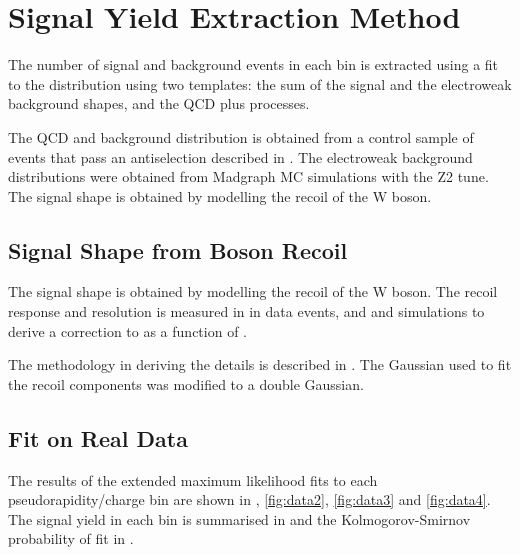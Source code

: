 \section{Signal Yield Extraction Method}
The number of signal and background events in each bin is extracted using a fit
to the \ETm distribution using two templates: the sum of the \Wenu signal and
the {electroweak} background shapes, and the {QCD} plus \gjet processes.

The {QCD} and \gjet background distribution is obtained from a control sample of
events that pass an antiselection described in .
The {electroweak} background \ETm distributions were obtained from Madgraph {MC}
simulations with the Z2 tune.
The signal \ETm shape is obtained by modelling the recoil of the W boson. 

\subsection{Signal \ETm Shape from Boson Recoil}
The signal \ETm shape is obtained by modelling the recoil of the W boson.  The
recoil response and resolution is measured in in
\HepProcess{\PZ\to\Pe\Pe} data events, and \PW and  simulations
to derive a correction to \ETm as a function of \PW \pT.

The methodology in deriving the details is described in .
The Gaussian used to fit the recoil components was modified to a double
Gaussian.

\subsection{Fit on Real Data}

The results of the extended maximum likelihood fits to each pseudorapidity/charge
bin are shown in , \ref{fig:data2}, \ref{fig:data3} and
\ref{fig:data4}.
The signal yield in each bin is summarised in  and
the Kolmogorov-Smirnov probability of fit in .

